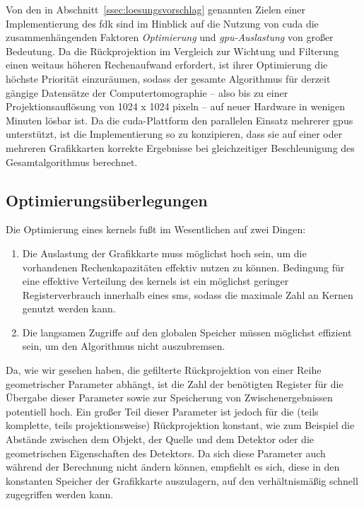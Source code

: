 Von den in Abschnitt~\ref{ssec:loesungsvorschlag} genannten Zielen einer Implementierung des \gls{fdk} sind im Hinblick
auf die Nutzung von \gls{cuda} die zusammenhängenden Faktoren \textit{Optimierung} und \textit{\gls{gpu}-Auslastung}
von großer Bedeutung. Da die Rückprojektion im Vergleich zur Wichtung und Filterung einen weitaus höheren Rechenaufwand
erfordert, ist ihrer Optimierung die höchste Priorität einzuräumen, sodass der gesamte Algorithmus für derzeit gängige
Datensätze der Computertomographie -- also bis zu einer Projektionsauflösung von 1024 x 1024 \gls{pixel}n -- auf neuer
Hardware in wenigen Minuten lösbar ist. Da die \gls{cuda}-Plattform den parallelen Einsatz mehrerer \gls{gpu}s
unterstützt, ist die Implementierung so zu konzipieren, dass sie auf einer oder mehreren Grafikkarten korrekte
Ergebnisse bei gleichzeitiger Beschleunigung des Gesamtalgorithmus berechnet.

\subsection{Optimierungsüberlegungen}

Die Optimierung eines \gls{kernel}s fußt im Wesentlichen auf zwei Dingen:

\begin{enumerate}
    \item Die Auslastung der Grafikkarte muss möglichst hoch sein, um die vorhandenen Rechenkapazitäten effektiv nutzen
          zu können. Bedingung für eine effektive Verteilung des \gls{kernel}s ist ein möglichst geringer
          Registerverbrauch innerhalb eines \gls{sm}s, sodass die maximale Zahl an Kernen genutzt werden kann.
    \item Die langsamen Zugriffe auf den globalen Speicher müssen möglichst effizient sein, um den Algorithmus nicht
          auszubremsen.
\end{enumerate}

Da, wie wir gesehen haben, die gefilterte Rückprojektion von einer Reihe geometrischer Parameter abhängt, ist die Zahl
der benötigten Register für die Übergabe dieser Parameter sowie zur Speicherung von Zwischenergebnissen potentiell hoch.
Ein großer Teil dieser Parameter ist jedoch für die (teils komplette, teils projektionsweise) Rückprojektion konstant,
wie zum Beispiel die Abstände zwischen dem Objekt, der Quelle und dem Detektor oder die geometrischen Eigenschaften
des Detektors. Da sich diese Parameter auch während der Berechnung nicht ändern können, empfiehlt es sich, diese in
den konstanten Speicher der Grafikkarte auszulagern, auf den verhältnismäßig schnell zugegriffen werden kann.

